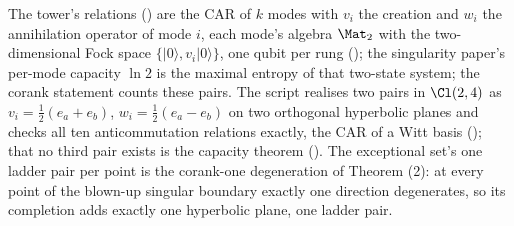 The tower's relations \cite[Prop.~4.1]{ButlerT3} () are the CAR of $k$ modes with $v_i$ the creation and $w_i$ the annihilation operator of mode $i$, each mode's algebra $\Mat_2$ with the two-dimensional Fock space $\{|0\rangle, v_i|0\rangle\}$, one qubit per rung \cite[Thm.~4.2]{ButlerT3} (); the singularity paper's per-mode capacity $\ln 2$ is the maximal entropy of that two-state system; the corank statement counts these pairs. The script realises two pairs in $\Cl(2,4)$ as $v_i = \tfrac12(e_a + e_b)$, $w_i = \tfrac12(e_a - e_b)$ on two orthogonal hyperbolic planes and checks all ten anticommutation relations exactly, the CAR of a Witt basis (); that no third pair exists is the capacity theorem \cite[Thm.~4.3]{ButlerT3} (). The exceptional set's one ladder pair per point is the corank-one degeneration of Theorem (2): at every point of the blown-up singular boundary exactly one direction degenerates, so its completion adds exactly one hyperbolic plane, one ladder pair.
